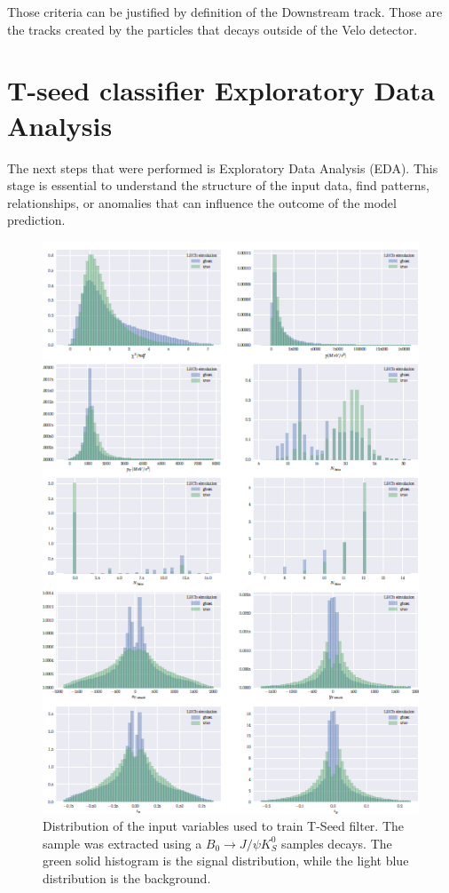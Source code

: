 Those criteria can be justified by definition of the Downstream track. Those are the tracks created by the particles that decays outside of the Velo detector. 

\section{T-seed classifier Exploratory Data Analysis}

The next steps that were performed is Exploratory Data Analysis (EDA). This stage is essential to understand the structure of the input data, find patterns, relationships, or anomalies that can influence the outcome of the model prediction.   

\begin{figure}
\centering
\includegraphics[scale=0.9]{figures/features_2.png}
\caption{Distribution of the input variables used to train T-Seed filter. The sample was extracted using a $B_0\rightarrow J/\psi K_S^0 $ samples decays. The green solid histogram is the signal distribution, while the light blue
distribution is the background.
\label{fig:input features}}
\end{figure}

